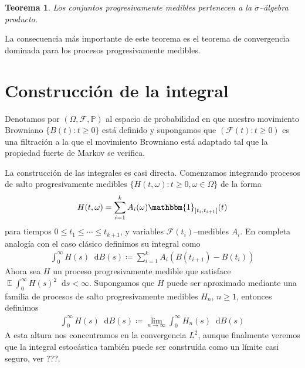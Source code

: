 \documentclass{report}
\newcommand{\characteristic}{\mathbbm{1}}
\newcommand{\prob}{\mathbb{P}}
\newcommand{\events}{\mathcal{F}}
\newcommand{\brownian}{B}
\newcommand{\dd}{\mathop{}\!\mathrm{d}}
\DeclareMathOperator{\Expectation}{\mathbb{E}}
\theoremstyle{plain}
\newtheorem{theorem}{Teorema}
\theoremstyle{remark}
\theoremstyle{definition}
\begin{document}
\begin{theorem}
  Los conjuntos progresivamente medibles pertenecen a la \(\sigma\)--álgebra producto.
\end{theorem}

La consecuencia más importante de este teorema es el teorema de convergencia dominada para los procesos progresivamente medibles.

\section{Construcción de la integral}
Denotamos por \((\Omega, \events, \prob)\) al espacio de probabilidad en que nuestro movimiento Browniano \(\{\brownian(t) : t \geq 0\}\) está definido y supongamos que \((\events(t) : t \geq 0)\) es una filtración a la que el movimiento Browniano está adaptado tal que la propiedad fuerte de Markov se verifica.

La construcción de las integrales es casi directa.
Comenzamos integrando procesos de salto progresivamente medibles \(\{H(t, \omega) : t \geq 0, \omega \in \Omega\}\) de la forma
\begin{align}
  H(t, \omega)
  =
  \sum_{i = 1}^k A_i(\omega)\characteristic_{\left] t_i, t_{i + 1} \right]}(t)
\end{align}
para tiempos \(0 \leq t_1 \leq \cdots \leq t_{k + 1}\), y variables \(\events(t_i)\)--medibles \(A_i\).
En completa analogía con el caso clásico definimos su integral como
\begin{align}
  \int_0^{\infty} H(s) \dd \brownian(s)
  \coloneqq
  \sum_{i = 1}^k A_i (\brownian(t_{i + 1}) - \brownian(t_i))
\end{align}
Ahora sea \(H\) un proceso progresivamente medible que satisface \(\Expectation \int_0^{\infty} H(s)^2 \dd s < \infty\).
Supongamos que \(H\) puede ser aproximado mediante una familia de procesos de salto progresivamente medibles \(H_n\), \(n \geq 1\), entonces definimos
\begin{align}
  \int_0^\infty H(s) \dd \brownian(s)
  \coloneqq
  \lim_{n \rightarrow \infty} \int_0^\infty H_n(s) \dd \brownian(s)
  \label{definition:stochasticIntegralWithRespectToBrownianMotion_norm2Approximation}
\end{align}
A esta altura nos concentramos en la convergencia \(L^2\), aunque finalmente veremos que la integral estocástica también puede ser construída como un límite casi seguro, ver ???.
\end{document}
